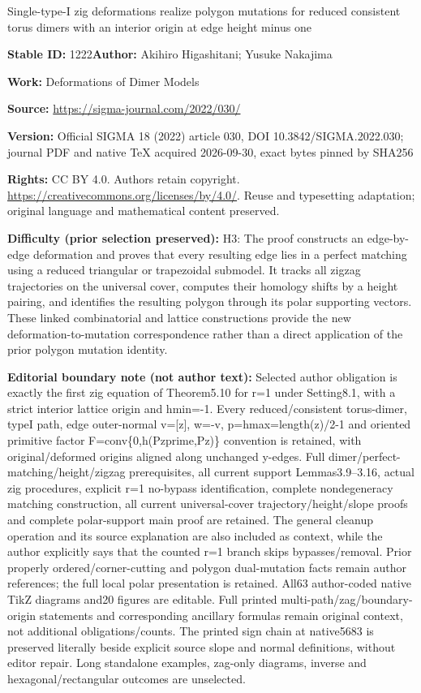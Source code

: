 \documentclass[11pt]{article}
\numberwithin{equation}{section}
\numberwithin{equation}{section}
\numberwithin{figure}{section}
\numberwithin{table}{section}
\begin{document}
\begin{center}\Large Single-type-I zig deformations realize polygon mutations for reduced consistent torus dimers with an interior origin at edge height minus one\end{center}
\noindent\textbf{Stable ID:} 1222\quad\textbf{Author:} Akihiro Higashitani; Yusuke Nakajima\par
\noindent\textbf{Work:} Deformations of Dimer Models\par
\noindent\textbf{Source:} \url{https://sigma-journal.com/2022/030/}\par
\noindent\textbf{Version:} Official SIGMA 18 (2022) article 030, DOI 10.3842/SIGMA.2022.030; journal PDF and native TeX acquired 2026-09-30, exact bytes pinned by SHA256\par
\noindent\textbf{Rights:} CC BY 4.0. Authors retain copyright. \url{https://creativecommons.org/licenses/by/4.0/}. Reuse and typesetting adaptation; original language and mathematical content preserved.\par
\noindent\textbf{Difficulty (prior selection preserved):} {\CJKfont H3: The proof constructs an edge-by-edge deformation and proves that every resulting edge lies in a perfect matching using a reduced triangular or trapezoidal submodel. It tracks all zigzag trajectories on the universal cover, computes their homology shifts by a height pairing, and identifies the resulting polygon through its polar supporting vectors. These linked combinatorial and lattice constructions provide the new deformation-to-mutation correspondence rather than a direct application of the prior polygon mutation identity.}\par
\medskip\noindent\textbf{Editorial boundary note (not author text):} Selected author obligation is exactly the first zig equation of Theorem5.10 for r=1 under Setting8.1, with a strict interior lattice origin and hmin=-1. Every reduced/consistent torus-dimer, typeI path, edge outer-normal v=[z], w=-v, p=hmax=length(z)/2-1 and oriented primitive factor F=conv\{0,h(Pzprime,Pz)\} convention is retained, with original/deformed origins aligned along unchanged y-edges. Full dimer/perfect-matching/height/zigzag prerequisites, all current support Lemmas3.9–3.16, actual zig procedures, explicit r=1 no-bypass identification, complete nondegeneracy matching construction, all current universal-cover trajectory/height/slope proofs and complete polar-support main proof are retained. The general cleanup operation and its source explanation are also included as context, while the author explicitly says that the counted r=1 branch skips bypasses/removal. Prior properly ordered/corner-cutting and polygon dual-mutation facts remain author references; the full local polar presentation is retained. All63 author-coded native TikZ diagrams and20 figures are editable. Full printed multi-path/zag/boundary-origin statements and corresponding ancillary formulas remain original context, not additional obligations/counts. The printed sign chain at native5683 is preserved literally beside explicit source slope and normal definitions, without editor repair. Long standalone examples, zag-only diagrams, inverse and hexagonal/rectangular outcomes are unselected.\par
\end{document}
